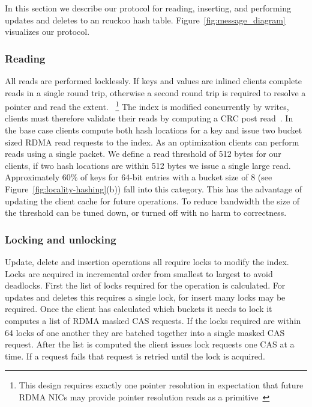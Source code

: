 In this section we describe our protocol for reading,
inserting, and performing updates and deletes to an rcuckoo
hash table. Figure~\ref{fig:message_diagram} visualizes our
protocol.

\subsubsection{Reading} All reads are performed locklessly.
If keys and values are inlined clients complete reads in a
single round trip, otherwise a second round trip is required
to resolve a pointer and read the extent. 
~\footnote{This design requires exactly one pointer
resolution in expectation that future RDMA NICs may provide
pointer resolution reads as a primitive~\cite{prism}}
The index is modified concurrently by writes, clients must
therefore validate their reads by computing a CRC post
read~\cite{pilaf,cell}.
In the base case clients compute both hash locations for a
key and issue two bucket sized RDMA read requests to the
index. As an optimization clients can perform reads using a
single packet. We define a read threshold of 512 bytes for
our clients, if two hash locations are within 512 bytes we
issue a single large read.  Approximately 60\% of keys for
64-bit entries with a bucket size of 8 (see
Figure~\ref{fig:locality-hashing}(b)) fall into this
category. This has the advantage of updating the client
cache for future operations.
To reduce bandwidth the size
of the threshold can be tuned down, or turned off with no
harm to correctness.

\subsubsection{Locking and unlocking}

Update, delete and insertion operations all require locks to
modify the index. Locks are acquired in incremental order
from smallest to largest to avoid deadlocks. First the list
of locks required for the operation is calculated. For
updates and deletes this requires a single lock, for insert
many locks may be required. Once the client has calculated
which buckets it needs to lock it computes a list of RDMA
masked CAS requests. If the locks required are within 64
locks of one another they are batched together into a single
masked CAS request. After the list is computed the client
issues lock requests one CAS at a time. If a request
fails that request is retried until the lock is acquired.

